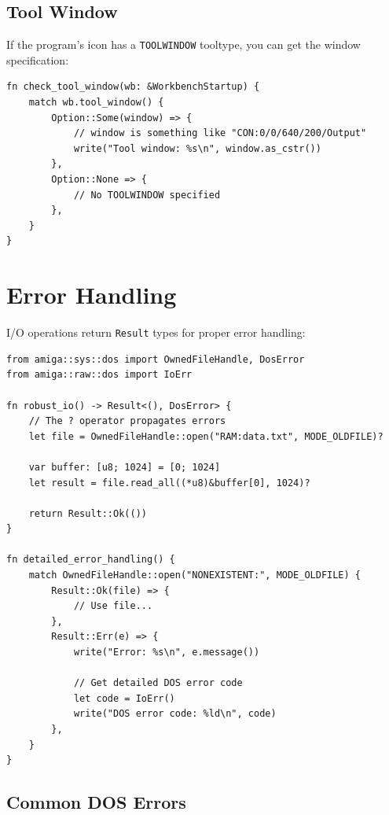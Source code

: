 \subsection{Tool Window}

If the program's icon has a \texttt{TOOLWINDOW} tooltype, you can get the window specification:

\begin{lstlisting}
fn check_tool_window(wb: &WorkbenchStartup) {
    match wb.tool_window() {
        Option::Some(window) => {
            // window is something like "CON:0/0/640/200/Output"
            write("Tool window: %s\n", window.as_cstr())
        },
        Option::None => {
            // No TOOLWINDOW specified
        },
    }
}
\end{lstlisting}

\section{Error Handling}
\label{sec:io-errors}

I/O operations return \texttt{Result} types for proper error handling:

\begin{lstlisting}
from amiga::sys::dos import OwnedFileHandle, DosError
from amiga::raw::dos import IoErr

fn robust_io() -> Result<(), DosError> {
    // The ? operator propagates errors
    let file = OwnedFileHandle::open("RAM:data.txt", MODE_OLDFILE)?

    var buffer: [u8; 1024] = [0; 1024]
    let result = file.read_all((*u8)&buffer[0], 1024)?

    return Result::Ok(())
}

fn detailed_error_handling() {
    match OwnedFileHandle::open("NONEXISTENT:", MODE_OLDFILE) {
        Result::Ok(file) => {
            // Use file...
        },
        Result::Err(e) => {
            write("Error: %s\n", e.message())

            // Get detailed DOS error code
            let code = IoErr()
            write("DOS error code: %ld\n", code)
        },
    }
}
\end{lstlisting}

\subsection{Common DOS Errors}

